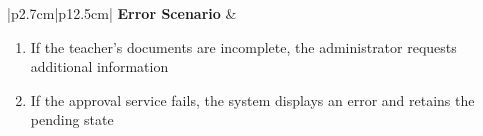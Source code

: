 \begin{table}[H]
\begin{tabular}{|p{2.7cm}|p{12.5cm}|}
        \hline
        \textbf{Error Scenario} & \begin{minipage}[t]{\linewidth}
                                      \begin{enumerate}[topsep=0pt,itemsep=1pt,parsep=0pt,partopsep=0pt]
                                          \item If the teacher's documents are incomplete, the administrator requests
                                                additional information
                                          \item If the approval service fails, the system displays an error and retains the
                                                pending state
                                      \end{enumerate}
                                  \end{minipage}             \\
        \hline
    \end{tabular}
    \label{tab:admin-approve-teacher-account}
\end{table}
